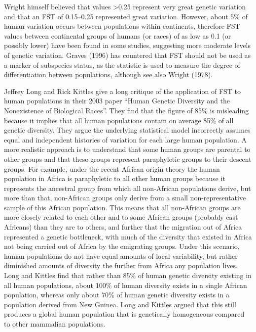 Wright himself believed that values \textgreater{}0.25 represent very great genetic variation and that an FST of 0.15--0.25 represented great variation. However, about 5\% of human variation occurs between populations within continents, therefore FST values between continental groups of humans (or races) of as low as 0.1 (or possibly lower) have been found in some studies, suggesting more moderate levels of genetic variation. Graves (1996) has countered that FST should not be used as a marker of subspecies status, as the statistic is used to measure the degree of differentiation between populations, although see also Wright (1978).

Jeffrey Long and Rick Kittles give a long critique of the application of FST to human populations in their 2003 paper ``Human Genetic Diversity and the Nonexistence of Biological Races''. They find that the figure of 85\% is misleading because it implies that all human populations contain on average 85\% of all genetic diversity. They argue the underlying statistical model incorrectly assumes equal and independent histories of variation for each large human population. A more realistic approach is to understand that some human groups are parental to other groups and that these groups represent paraphyletic groups to their descent groups. For example, under the recent African origin theory the human population in Africa is paraphyletic to all other human groups because it represents the ancestral group from which all non-African populations derive, but more than that, non-African groups only derive from a small non-representative sample of this African population. This means that all non-African groups are more closely related to each other and to some African groups (probably east Africans) than they are to others, and further that the migration out of Africa represented a genetic bottleneck, with much of the diversity that existed in Africa not being carried out of Africa by the emigrating groups. Under this scenario, human populations do not have equal amounts of local variability, but rather diminished amounts of diversity the further from Africa any population lives. Long and Kittles find that rather than 85\% of human genetic diversity existing in all human populations, about 100\% of human diversity exists in a single African population, whereas only about 70\% of human genetic diversity exists in a population derived from New Guinea. Long and Kittles argued that this still produces a global human population that is genetically homogeneous compared to other mammalian populations.

